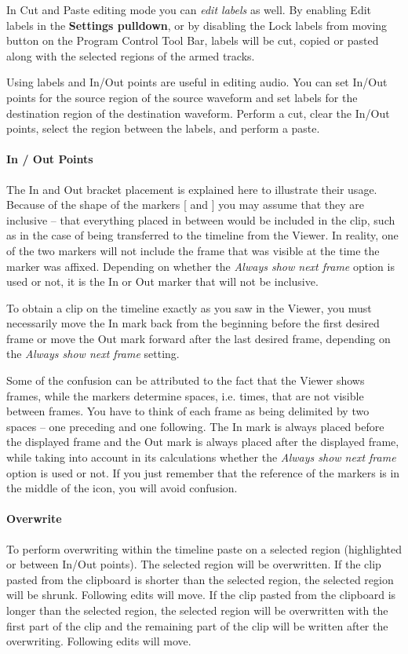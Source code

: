 In Cut and Paste editing mode you can \textit{edit labels} as well. By enabling Edit labels in the \textbf{Settings pulldown}, or by disabling the Lock labels from moving button on the Program Control Tool Bar, labels will be cut, copied or pasted along with the selected regions of the armed tracks.

Using labels and In/Out points are useful in editing audio.  You can set In/Out points for the source region of the source waveform and set labels for the destination region of the destination waveform. Perform a cut, clear the In/Out points, select the region between the labels, and perform a paste.

\paragraph{In / Out Points} The In and Out bracket placement is explained here to illustrate their usage.  Because of the shape of the markers [ and ] you may assume that they are inclusive -- that everything placed in between would be included in the clip, such as in the case of being transferred to the timeline from the Viewer.  In reality, one of the two markers will not include the frame that was visible at the time the marker was affixed. Depending on whether the \textit{Always show next frame} option is used or not, it is the In or Out marker that will not be inclusive. 

To obtain a clip on the timeline exactly as you saw in the Viewer, you must necessarily move the In mark back from the beginning before the first desired frame or move the Out mark forward after the last desired frame, depending on the \textit{Always show next frame} setting. 

Some of the confusion can be attributed to the fact that the Viewer shows frames, while the markers determine spaces, i.e. times, that are not visible between frames. You have to think of each frame as being delimited by two spaces -- one preceding and one following.  The In mark is always placed before the displayed frame and the Out mark is always placed after the displayed frame, while taking into account in its calculations whether the \textit{Always show next frame }option is used or not. If you just remember that the reference of the markers is in the middle of the icon, you will avoid confusion.

\paragraph{Overwrite} To perform overwriting within the timeline paste on a selected region (highlighted or
between In/Out points). The selected region will be overwritten. If the clip pasted from the clipboard
is shorter than the selected region, the selected region will be shrunk. Following edits will move. If 
the clip pasted from the clipboard is longer than the selected region, the selected region will be
overwritten with the first part of the clip and the remaining part of the clip will be written after the
overwriting. Following edits will move.

